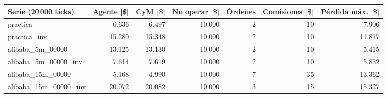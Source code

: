 \begin{tabular}{lrrrrrr}
\toprule
Serie (20\,000 ticks) & Agente [\$] & CyM [\$] & No operar [\$] & Órdenes & Comisiones [\$] & Pérdida máx. [\$] \\
\midrule
practica & 6.636 & 6.497 & 10.000 & 2 & 10 & 7.906 \\
practica\_inv & 15.280 & 15.348 & 10.000 & 2 & 10 & 11.817 \\
alibaba\_5m\_00000 & 13.125 & 13.130 & 10.000 & 2 & 10 & 5.415 \\
alibaba\_5m\_00000\_inv & 7.614 & 7.619 & 10.000 & 2 & 10 & 5.832 \\
alibaba\_15m\_00000 & 5.168 & 4.990 & 10.000 & 7 & 35 & 13.362 \\
alibaba\_15m\_00000\_inv & 20.072 & 20.082 & 10.000 & 3 & 15 & 15.327 \\
\bottomrule
\end{tabular}
